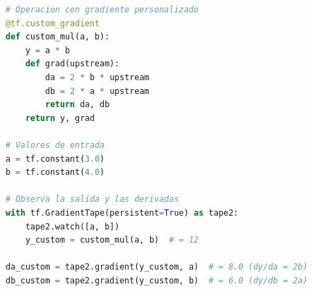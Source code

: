 \newpage
\begin{lstlisting}[language=Python,label=code:customgradient,caption=Definición de una operación con gradiente personalizado en TensorFlow.]
# Operacion con gradiente personalizado
@tf.custom_gradient
def custom_mul(a, b):
    y = a * b
    def grad(upstream):
        da = 2 * b * upstream
        db = 2 * a * upstream
        return da, db
    return y, grad

# Valores de entrada
a = tf.constant(3.0)
b = tf.constant(4.0)

# Observa la salida y las derivadas
with tf.GradientTape(persistent=True) as tape2:
    tape2.watch([a, b])
    y_custom = custom_mul(a, b)  # = 12

da_custom = tape2.gradient(y_custom, a)  # = 8.0 (dy/da = 2b)
db_custom = tape2.gradient(y_custom, b)  # = 6.0 (dy/db = 2a)
\end{lstlisting}
